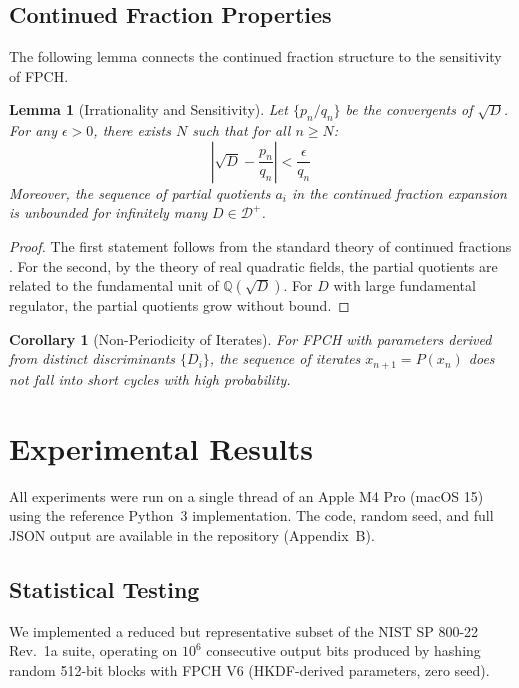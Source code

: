 \documentclass[11pt,a4paper]{article}
\theoremstyle{plain}
\newtheorem{lemma}[theorem]{Lemma}
\newtheorem{corollary}[theorem]{Corollary}
\theoremstyle{definition}
\theoremstyle{remark}
\begin{document}
\subsection{Continued Fraction Properties}

The following lemma connects the continued fraction structure to the sensitivity of FPCH.

\begin{lemma}[Irrationality and Sensitivity]\label{lem:irrationality}
Let $\{p_n/q_n\}$ be the convergents of $\sqrt{D}$. For any $\epsilon > 0$, there exists $N$ such that for all $n \geq N$:
\begin{equation}
\left|\sqrt{D} - \frac{p_n}{q_n}\right| < \frac{\epsilon}{q_n}
\end{equation}
Moreover, the sequence of partial quotients $a_i$ in the continued fraction expansion is unbounded for infinitely many $D \in \mathcal{D}^+$.
\end{lemma}

\begin{proof}
The first statement follows from the standard theory of continued fractions \cite{cohen1993}. For the second, by the theory of real quadratic fields, the partial quotients are related to the fundamental unit of $\mathbb{Q}(\sqrt{D})$. For $D$ with large fundamental regulator, the partial quotients grow without bound.
\end{proof}

\begin{corollary}[Non-Periodicity of Iterates]
For FPCH with parameters derived from distinct discriminants $\{D_i\}$, the sequence of iterates $x_{n+1} = P(x_n)$ does not fall into short cycles with high probability.
\end{corollary}

\section{Experimental Results}\label{sec:experiments}

All experiments were run on a single thread of an Apple M4 Pro (macOS 15) using the reference Python~3 implementation. The code, random seed, and full JSON output are available in the repository (Appendix~B).

\subsection{Statistical Testing}

We implemented a reduced but representative subset of the NIST SP 800-22 Rev.~1a suite, operating on $10^6$ consecutive output bits produced by hashing random 512-bit blocks with FPCH V6 (HKDF-derived parameters, zero seed).
\end{document}
